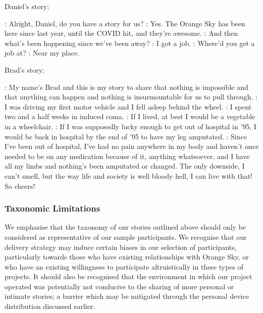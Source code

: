 \vspace{1cm}
Daniel's story:

\begin{drama}

    \volspeaks: Alright, Daniel, do you have a story for us?
    \danspeaks: Yes. The Orange Sky has been here since last year, until the COVID hit, and they're awesome.
    \volspeaks: And then what's been happening since we've been away?
    \danspeaks: I got a job.
    \volspeaks: Where'd you get a job at?
    \danspeaks: Near my place.
\end{drama}

\vspace{1cm}
Brad's story:

\begin{drama}

    \bradspeaks: My name's Brad and this is my story to share that nothing is impossible and that anything can happen and nothing is insurmountable for us to pull through. 
    \bradspeaks: I was driving my first motor vehicle and I fell asleep behind the wheel.
    \bradspeaks: I spent two and a half weeks in induced coma. 
    \bradspeaks: If I lived, at best I would be a vegetable in a wheelchair. 
    \bradspeaks: If I was supposedly lucky enough to get out of hospital in '95, I would be back in hospital by the end of '95 to have my leg amputated. 
    \bradspeaks: Since I've been out of hospital, I've had no pain anywhere in my body and haven't once needed to be on any medication because of it, anything whatsoever, and I have all my limbs and nothing's been amputated or changed. The only downside, I can't smell, but the way life and society is well bloody hell, I can live with that! So cheers!
\end{drama}

\subsubsection{Taxonomic Limitations}

We emphasise that the taxonomy of our stories outlined above should only be considered as representative of our sample participants. We recognise that our delivery strategy may induce certain biases in our selection of participants, particularly towards those who have existing relationships with Orange Sky, or who have an existing willingness to participate altruistically in these types of projects. It should also be recognised that the environment in which our project operated was potentially not conducive to the sharing of more personal or intimate stories; a barrier which may be mitigated through the personal device distribution discussed earlier.
